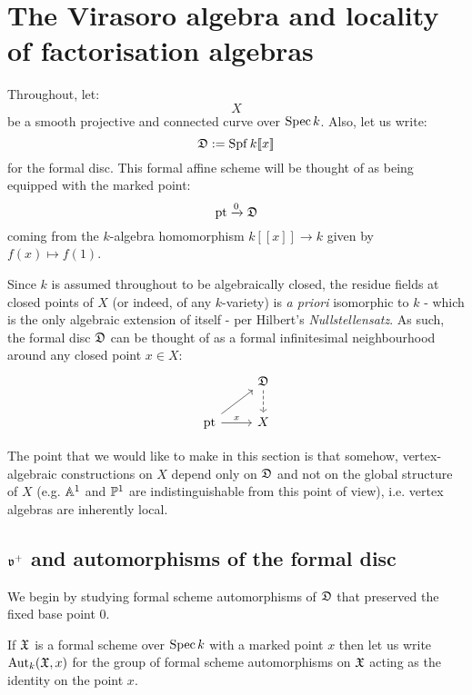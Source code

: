     \section{The Virasoro algebra and locality of factorisation algebras}
        \begin{convention}
                Throughout, let:
                    $$X$$
                be a smooth projective and connected curve over $\Spec k$. Also, let us write:
                    $$\frakD := \Spf k[\![x]\!]$$
                for the formal disc. This formal affine scheme will be thought of as being equipped with the marked point:
                    $$\pt \xrightarrow[]{0} \frakD$$
                coming from the $k$-algebra homomorphism $k[\![x]\!] \to k$ given by $f(x) \mapsto f(1)$. 
            \end{convention}
            
            Since $k$ is assumed throughout to be algebraically closed, the residue fields at closed points of $X$ (or indeed, of any $k$-variety) is \textit{a priori} isomorphic to $k$ - which is the only algebraic extension of itself - per Hilbert's \textit{Nullstellensatz}. As such, the formal disc $\frakD$ can be thought of as a formal infinitesimal neighbourhood around any closed point $x \in X$:
                $$
                    \begin{tikzcd}
                	& \frakD \\
                	\pt & X
                	\arrow[dashed, from=1-2, to=2-2]
                	\arrow[from=2-1, to=1-2]
                	\arrow["x", from=2-1, to=2-2]
                    \end{tikzcd}
                $$

            The point that we would like to make in this section is that somehow, vertex-algebraic constructions on $X$ depend only on $\frakD$ and not on the global structure of $X$ (e.g. $\A^1$ and $\P^1$ are indistinguishable from this point of view), i.e. vertex algebras are inherently local.
    
        \subsection{\texorpdfstring{$\frakv^+$}{} and automorphisms of the formal disc}
            We begin by studying formal scheme automorphisms of $\frakD$ that preserved the fixed base point $0$.
            \begin{convention}
                If $\frakX$ is a formal scheme over $\Spec k$ with a marked point $x$ then let us write $\Aut_k(\frakX, x)$ for the group of formal scheme automorphisms on $\frakX$ acting as the identity on the point $x$.
            \end{convention}
    
    \printbibliography

